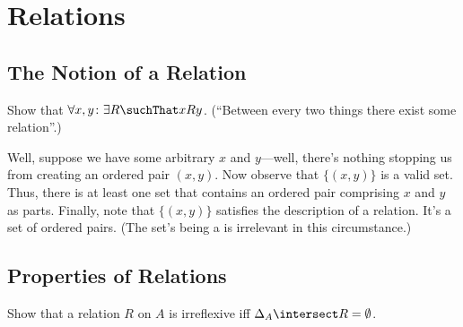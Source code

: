 \documentclass{report}
\begin{document}

\chapter{Relations}
\section{The Notion of a Relation}

\begin{Exercise} [number=13]
  Show that $\forall{x,y} \colon \exists{R} \suchThat xRy$. (``Between
  every two things there exist some relation''.)
\end{Exercise}

\begin{Answer}
  Well, suppose we have some arbitrary $x$ and $y$---well, there's
  nothing stopping us from creating an ordered pair $(x,y)$. Now
  observe that $\{(x,y)\}$ is a valid set. Thus, there is at least one
  set that contains an ordered pair comprising $x$ and $y$ as
  parts. Finally, note that $\{(x,y)\}$ satisfies the description of a
  relation. It's a set of ordered pairs. (The set's being a 
  is irrelevant in this circumstance.)
\end{Answer}
\section{Properties of Relations}

\newcommand{\R}{\mathrel{R}}

\begin{Exercise} [number=17]
  Show that a relation $R$ on $A$ is irreflexive iff $\Delta_A
  \intersect R = \emptyset$.
\end{Exercise}
\end{document}
